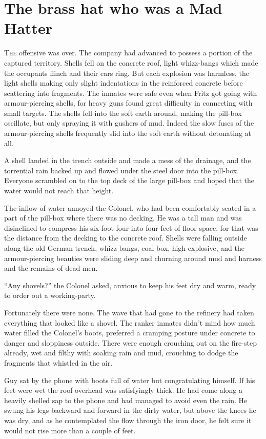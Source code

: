 \chapter*{\textsf{The brass hat who was a Mad Hatter}}

T\textsc{he} offensive was over. The company had advanced to possess a portion of the captured territory. Shells fell on the concrete roof, light whizz-bangs which made the occupants flinch and their ears ring. But each explosion was harmless, the light shells making only slight indentations in the reinforced concrete before scattering into fragments. The inmates were safe even when Fritz got going with armour-piercing shells, for heavy guns found great difficulty in connecting with small targets. The shells fell into the soft earth around, making the pill-box oscillate, but only spraying it with gushers of mud. Indeed the slow fuses of the armour-piercing shells frequently slid into the soft earth without detonating at all.

A shell landed in the trench outside and made a mess of the drainage, and the torrential rain backed up and flowed under the steel door into the pill-box. Everyone scrambled on to the top deck of the large pill-box and hoped that the water would not reach that height.

The inflow of water annoyed the Colonel, who had been comfortably seated in a part of the pill-box where there was no decking. He was a tall man and was disinclined to compress his six foot four into four feet of floor space, for that was the distance from the decking to the concrete roof. Shells were falling outside along the old German trench, whizz-bangs, coal-box, high explosive, and the armour-piercing beauties were sliding deep and churning around mud and harness and the remains of dead men.

``Any shovels?'' the Colonel asked, anxious to keep his feet dry and warm, ready to order out a working-party.

Fortunately there were none. The wave that had gone to the refinery had taken everything that looked like a shovel. The ranker inmates didn't mind how much water filled the Colonel's boots, preferred a cramping posture under concrete to danger and sloppiness outside. There were enough crouching out on the fire-step already, wet and filthy with soaking rain and mud, crouching to dodge the fragments that whistled in the air.

Guy sat by the phone with boots full of water but congratulating himself. If his feet were wet the roof overhead was satisfyingly thick. He had come along a heavily shelled sap to the phone and had managed to avoid even the rain. He swung his legs backward and forward in the dirty water, but above the knees he was dry, and as he contemplated the flow through the iron door, he felt sure it would not rise more than a couple of feet.

